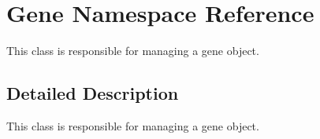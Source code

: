 \hypertarget{namespace_gene}{\section{Gene Namespace Reference}
\label{namespace_gene}
}


This class is responsible for managing a gene object.  




\subsection{Detailed Description}
This class is responsible for managing a gene object. 